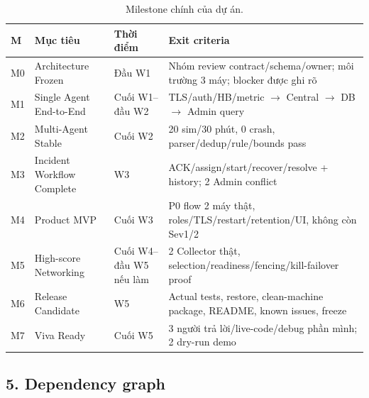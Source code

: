 \begin{table}[!ht]
\centering
\caption{Milestone chính của dự án.}
\label{tab:milestones}
\small
\begin{tabularx}{\textwidth}{p{1cm} p{3.8cm} p{2.2cm} X}
\toprule
\textbf{M} & \textbf{Mục tiêu} & \textbf{Thời điểm} & \textbf{Exit criteria} \\
\midrule
M0 & Architecture Frozen & Đầu W1 & Nhóm review contract/schema/owner; môi trường 3 máy; blocker được ghi rõ \\
M1 & Single Agent End-to-End & Cuối W1--đầu W2 & TLS/auth/HB/metric $\rightarrow$ Central $\rightarrow$ DB $\rightarrow$ Admin query \\
M2 & Multi-Agent Stable & Cuối W2 & 20 sim/30 phút, 0 crash, parser/dedup/rule/bounds pass \\
M3 & Incident Workflow Complete & W3 & ACK/assign/start/recover/resolve + history; 2 Admin conflict \\
M4 & Product MVP & Cuối W3 & P0 flow 2 máy thật, roles/TLS/restart/retention/UI, không còn Sev1/2 \\
M5 & High-score Networking & Cuối W4--đầu W5 nếu làm & 2 Collector thật, selection/readiness/fencing/kill-failover proof \\
M6 & Release Candidate & W5 & Actual tests, restore, clean-machine package, README, known issues, freeze \\
M7 & Viva Ready & Cuối W5 & 3 người trả lời/live-code/debug phần mình; 2 dry-run demo \\
\bottomrule
\end{tabularx}
\end{table}

\subsection*{5. Dependency graph}

